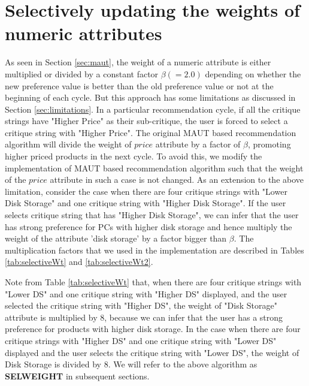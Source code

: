 \section{Selectively updating the weights of numeric attributes}
\label{sec:sel}
As seen in Section \ref{sec:maut}, the weight of a numeric attribute is either multiplied or divided by a constant factor $\beta (=2.0)$ depending on whether the new preference value is better than the old preference value or not at the beginning of each cycle.
But this approach has some limitations as discussed in Section \ref{sec:limitations}.
In a particular recommendation cycle, if all the critique strings have "Higher Price" as their sub-critique, the user is forced to select a critique string with "Higher Price".
The original MAUT based recommendation algorithm will divide the weight of $price$ attribute by a factor of $\beta$, promoting higher priced products in the next cycle.
To avoid this, we modify the implementation of MAUT based recommendation algorithm such that the weight of the $price$ attribute in such a case is not changed.
As an extension to the above limitation, consider the case when there are four critique strings with "Lower Disk Storage" and one critique string with "Higher Disk Storage". 
If the user selects critique string that has "Higher Disk Storage", we can infer that the user has strong preference for PCs with higher disk storage and hence multiply the weight of the attribute 'disk storage' by a factor bigger than $\beta$.
The multiplication factors that we used in the implementation are described in Tables \ref{tab:selectiveWt} and \ref{tab:selectiveWt2}.

Note from Table \ref{tab:selectiveWt} that, when there are four critique strings with "Lower DS" and one critique string with "Higher DS" displayed, and the user selected the critique string with "Higher DS", 
the weight of "Disk Storage" attribute is multiplied by 8, because we can infer that the user has a strong preference for products with higher disk storage.
In the case when there are four critique strings with "Higher DS" and one critique string with "Lower DS" displayed and the user selects the critique string with "Lower DS", the weight of Disk Storage is divided by 8. 
We will refer to the above algorithm as \textbf{SELWEIGHT} in subsequent sections.



